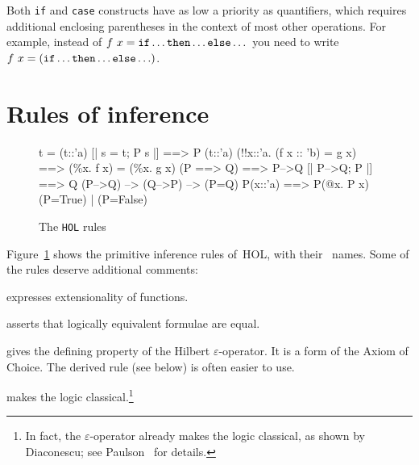 \begin{warn}
Both \texttt{if} and \texttt{case} constructs have as low a priority as
quantifiers, which requires additional enclosing parentheses in the context
of most other operations.  For example, instead of $f~x = {\tt if\dots
then\dots else}\dots$ you need to write $f~x = ({\tt if\dots then\dots
else\dots})$.
\end{warn}

\section{Rules of inference}

\begin{figure}
\begin{ttbox}\makeatother
{}          t = (t::'a)
         [| s = t; P s |] ==> P (t::'a)
           (!!x::'a. (f x :: 'b) = g x) ==> (\%x. f x) = (\%x. g x)
          (P ==> Q) ==> P-->Q
            [| P-->Q;  P |] ==> Q
           (P-->Q) --> (Q-->P) --> (P=Q)
         P(x::'a) ==> P(@x. P x)
 (P=True) | (P=False)
\end{ttbox}
\caption{The \texttt{HOL} rules} \label{hol-rules}
\end{figure}

Figure~\ref{hol-rules} shows the primitive inference rules of~HOL, with
their~{\ML} names.  Some of the rules deserve additional comments:
\begin{ttdescription}
\item[\tdx{ext}] expresses extensionality of functions.
\item[\tdx{iff}] asserts that logically equivalent formulae are
  equal.
\item[\tdx{someI}] gives the defining property of the Hilbert
  $\varepsilon$-operator.  It is a form of the Axiom of Choice.  The derived rule
   (see below) is often easier to use.
\item[\tdx{True_or_False}] makes the logic classical.\footnote{In
    fact, the $\varepsilon$-operator already makes the logic classical, as
    shown by Diaconescu; see Paulson~\cite{paulson-COLOG} for details.}
\end{ttdescription}


